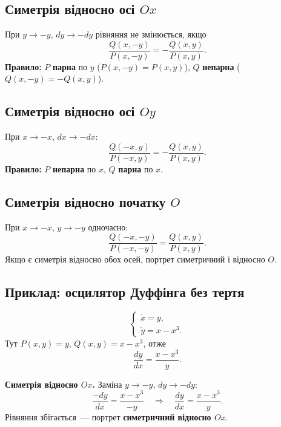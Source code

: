 \documentclass[12pt,a4paper]{article}
\begin{document}
\subsection{Симетрія відносно осі $Ox$}

При $y\to-y$, $dy\to-dy$ рівняння не змінюється, якщо
\begin{equation}\label{eq:sym-Ox}
  \frac{Q(x,-y)}{P(x,-y)} = -\frac{Q(x,y)}{P(x,y)}.
\end{equation}
\textbf{Правило:} $P$ \textbf{парна} по $y$ ($P(x,-y)=P(x,y)$), $Q$ \textbf{непарна}
($Q(x,-y)=-Q(x,y)$).

\subsection{Симетрія відносно осі $Oy$}

При $x\to-x$, $dx\to-dx$:
\begin{equation}\label{eq:sym-Oy}
  \frac{Q(-x,y)}{P(-x,y)} = -\frac{Q(x,y)}{P(x,y)}.
\end{equation}
\textbf{Правило:} $P$ \textbf{непарна} по $x$, $Q$ \textbf{парна} по $x$.

\subsection{Симетрія відносно початку $O$}

При $x\to-x$, $y\to-y$ одночасно:
\begin{equation}\label{eq:sym-O}
  \frac{Q(-x,-y)}{P(-x,-y)} = \frac{Q(x,y)}{P(x,y)}.
\end{equation}
Якщо є симетрія відносно обох осей, портрет симетричний і відносно $O$.

\subsection{Приклад: осцилятор Дуффінга без тертя}

\begin{equation}\label{eq:duffing}
\begin{cases}
  \dot{x} = y,\\
  \dot{y} = x - x^3.
\end{cases}
\end{equation}
Тут $P(x,y)=y$, $Q(x,y)=x-x^3$, отже
\begin{equation*}
  \frac{dy}{dx} = \frac{x-x^3}{y}.
\end{equation*}

\textbf{Симетрія відносно $Ox$.}
Заміна $y\to-y$, $dy\to-dy$:
\begin{equation*}
  \frac{-dy}{dx}=\frac{x-x^3}{-y}
  \quad\Longrightarrow\quad
  \frac{dy}{dx}=\frac{x-x^3}{y}.
\end{equation*}
Рівняння збігається~--- портрет \textbf{симетричний відносно $Ox$}.
\end{document}
